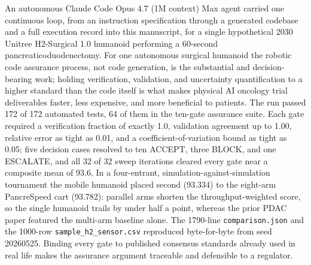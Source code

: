 
An autonomous Claude Code Opus 4.7 (1M context) Max agent carried one continuous
loop, from an instruction specification through a generated codebase and a full
execution record into this manuscript, for a single hypothetical 2030 Unitree
H2-Surgical 1.0 humanoid performing a 60-second pancreaticoduodenectomy. For one
autonomous surgical humanoid the robotic code assurance process, not code
generation, is the substantial and decision-bearing work; holding verification,
validation, and uncertainty quantification to a higher standard than the code
itself is what makes physical AI oncology trial deliverables faster, less
expensive, and more beneficial to patients. The run passed 172 of 172 automated
tests, 64 of them in the ten-gate assurance suite. Each gate required a
verification fraction of exactly 1.0, validation agreement up to 1.00, relative
error as tight as 0.01, and a coefficient-of-variation bound as tight as 0.05;
five decision cases resolved to ten ACCEPT, three BLOCK, and one ESCALATE, and
all 32 of 32 sweep iterations cleared every gate near a composite mean of 93.6.
In a four-entrant, simulation-against-simulation tournament the mobile humanoid
placed second (93.334) to the eight-arm PancreSpeed cart (93.782): parallel arms
shorten the throughput-weighted score, so the single humanoid trails by under
half a point, whereas the prior PDAC paper featured the multi-arm baseline alone.
The 1790-line \texttt{comparison.json} and the 1000-row
\texttt{sample\_h2\_sensor.csv} reproduced byte-for-byte from seed 20260525.
Binding every gate to published consensus standards already used in real life
makes the assurance argument traceable and defensible to a regulator.
